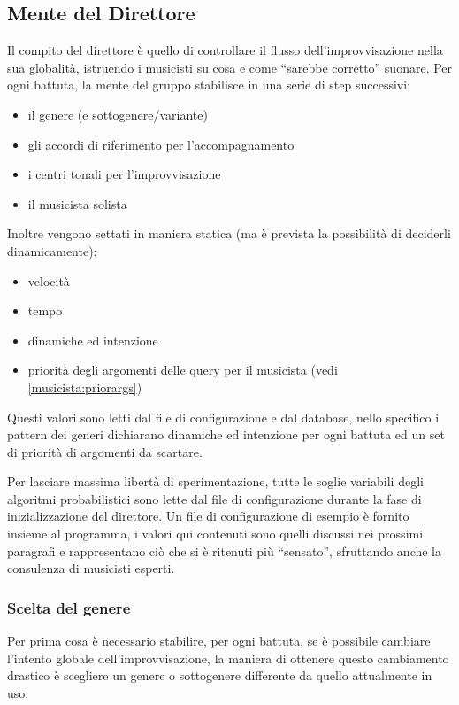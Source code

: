 \subsection{Mente del Direttore}
Il compito del direttore è quello di controllare il flusso dell'improvvisazione nella sua globalità, istruendo i musicisti su cosa e come ``sarebbe corretto'' suonare. 
Per ogni battuta, la mente del gruppo stabilisce in una serie di step successivi:
\begin{itemize}
\item il genere (e sottogenere/variante)
\item gli accordi di riferimento per l'accompagnamento
\item i centri tonali per l'improvvisazione
\item il musicista solista
\end{itemize}

\noindent
Inoltre vengono settati in maniera statica (ma è prevista la possibilità di deciderli dinamicamente):
\begin{itemize}
\item velocità
\item tempo
\item dinamiche ed intenzione
\item priorità degli argomenti delle query per il musicista (vedi \ref{musicista:priorargs}) %
\end{itemize}

Questi valori sono letti dal file di configurazione e dal database, nello specifico i pattern dei generi dichiarano dinamiche ed intenzione per ogni battuta ed un set di priorità di argomenti da scartare.

Per lasciare massima libertà di sperimentazione, tutte le soglie variabili degli algoritmi probabilistici sono lette dal file di configurazione durante la fase di inizializzazione del direttore.
Un file di configurazione di esempio è fornito insieme al programma, i valori qui contenuti sono quelli discussi nei prossimi paragrafi e rappresentano ciò che si è ritenuti più ``sensato'', sfruttando anche la consulenza di musicisti esperti. %

\subsubsection{Scelta del genere}
Per prima cosa è necessario stabilire, per ogni battuta, se è possibile cambiare l'intento globale dell'improvvisazione, la maniera di ottenere questo cambiamento drastico è scegliere un genere o sottogenere differente da quello attualmente in uso.

